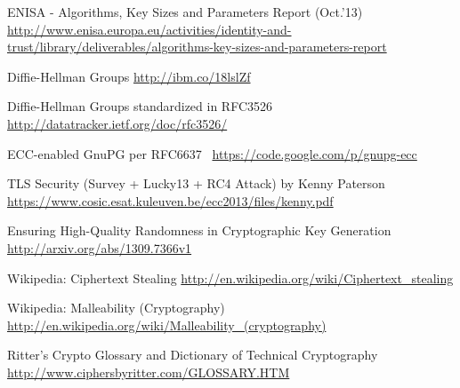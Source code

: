 \begin{itemize*}
  \item ENISA - Algorithms, Key Sizes and Parameters Report (Oct.'13) \url{http://www.enisa.europa.eu/activities/identity-and-trust/library/deliverables/algorithms-key-sizes-and-parameters-report}
  \item Diffie-Hellman Groups \url{http://ibm.co/18lslZf}
  \item Diffie-Hellman Groups standardized in RFC3526~\cite{rfc3526} \url{http://datatracker.ietf.org/doc/rfc3526/}
  \item ECC-enabled GnuPG per RFC6637~\cite{rfc6637} \url{https://code.google.com/p/gnupg-ecc}
  \item TLS Security (Survey + Lucky13 + RC4 Attack) by Kenny Paterson \url{https://www.cosic.esat.kuleuven.be/ecc2013/files/kenny.pdf}
  \item Ensuring High-Quality Randomness in Cryptographic Key Generation \url{http://arxiv.org/abs/1309.7366v1}
  \item Wikipedia: Ciphertext Stealing \url{http://en.wikipedia.org/wiki/Ciphertext_stealing}
  \item Wikipedia: Malleability (Cryptography) \url{http://en.wikipedia.org/wiki/Malleability_(cryptography)}
  \item Ritter's Crypto Glossary and Dictionary of Technical Cryptography \url{http://www.ciphersbyritter.com/GLOSSARY.HTM}
\end{itemize*}
